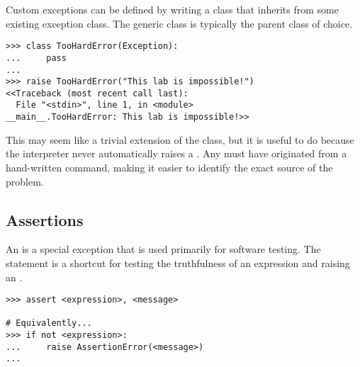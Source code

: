 Custom exceptions can be defined by writing a class that inherits from some existing exception class.
The generic  class is typically the parent class of choice.

\begin{lstlisting}
>>> class TooHardError(Exception):
...     pass
...
>>> raise TooHardError("This lab is impossible!")
<<Traceback (most recent call last):
  File "<stdin>", line 1, in <module>
__main__.TooHardError: This lab is impossible!>>
\end{lstlisting}

This may seem like a trivial extension of the  class, but it is useful to do because the interpreter never automatically raises a .
Any  must have originated from a hand-written  command, making it easier to identify the exact source of the problem.

\subsection*{Assertions} %

An  is a special exception that is used primarily for software testing.
The  statement is a shortcut for testing the truthfulness of an expression and raising an .

\begin{lstlisting}
>>> assert <expression>, <message>

# Equivalently...
>>> if not <expression>:
...     raise AssertionError(<message>)
...
\end{lstlisting}

\begin{comment} %
\subsection*{Chaining Exceptions} %
\begin{lstlisting}
>>> try:
>>>     raise ValueError("First Exception")
>>> except ValueError as e:
>>>     raise TypeError("Second Exception") from e
\end{lstlisting}
This syntax makes it possible to see where an error originated from and to ``pass it up'' to the next process.
\end{comment}

\begin{comment}
\subsection*{Buffering} %
The {open()} function also accepts a third argument that specifies buffering size.
\end{comment}

